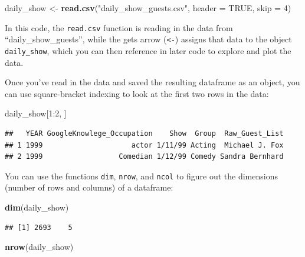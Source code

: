 \documentclass[]{book}
\makeatletter
\newenvironment{Shaded}{\begin{snugshade}}{\end{snugshade}}
\newcommand{\KeywordTok}[1]{\textcolor[rgb]{0.13,0.29,0.53}{\textbf{{#1}}}}
\newcommand{\DataTypeTok}[1]{\textcolor[rgb]{0.13,0.29,0.53}{{#1}}}
\newcommand{\DecValTok}[1]{\textcolor[rgb]{0.00,0.00,0.81}{{#1}}}
\newcommand{\StringTok}[1]{\textcolor[rgb]{0.31,0.60,0.02}{{#1}}}
\newcommand{\OtherTok}[1]{\textcolor[rgb]{0.56,0.35,0.01}{{#1}}}
\newcommand{\NormalTok}[1]{{#1}}
\newenvironment{kframe}{%
\medskip{}
\setlength{\fboxsep}{.8em}
 \def\at@end@of@kframe{}%
 \ifinner\ifhmode%
  \def\at@end@of@kframe{\end{minipage}}%
  \begin{minipage}{\columnwidth}%
 \fi\fi%
 \def\FrameCommand##1{\hskip\@totalleftmargin \hskip-\fboxsep
 \colorbox{shadecolor}{##1}\hskip-\fboxsep
     \hskip-\linewidth \hskip-\@totalleftmargin \hskip\columnwidth}%
 \MakeFramed {\advance\hsize-\width
   \@totalleftmargin\z@ \linewidth\hsize
   \@setminipage}}%
 {\par\unskip\endMakeFramed%
 \at@end@of@kframe}
\renewenvironment{Shaded}{\begin{kframe}}{\end{kframe}}
\makeatother
\begin{document}
\begin{Shaded}
\begin{Highlighting}[]
\NormalTok{daily_show <-}\StringTok{ }\KeywordTok{read.csv}\NormalTok{(}\StringTok{"daily_show_guests.csv"}\NormalTok{,}
                       \DataTypeTok{header =} \OtherTok{TRUE}\NormalTok{,}
                       \DataTypeTok{skip =} \DecValTok{4}\NormalTok{)}
\end{Highlighting}
\end{Shaded}

In this code, the \texttt{read.csv} function is reading in the data from
``daily\_show\_guests'', while the gets arrow (\texttt{\textless{}-})
assigns that data to the object \texttt{daily\_show}, which you can then
reference in later code to explore and plot the data.

Once you've read in the data and saved the resulting dataframe as an
object, you can use square-bracket indexing to look at the first two
rows in the data:

\begin{Shaded}
\begin{Highlighting}[]
\NormalTok{daily_show[}\DecValTok{1}\NormalTok{:}\DecValTok{2}\NormalTok{, ]}
\end{Highlighting}
\end{Shaded}

\begin{verbatim}
##   YEAR GoogleKnowlege_Occupation    Show  Group  Raw_Guest_List
## 1 1999                     actor 1/11/99 Acting  Michael J. Fox
## 2 1999                  Comedian 1/12/99 Comedy Sandra Bernhard
\end{verbatim}

You can use the functions \texttt{dim}, \texttt{nrow}, and \texttt{ncol}
to figure out the dimensions (number of rows and columns) of a
dataframe:

\begin{Shaded}
\begin{Highlighting}[]
\KeywordTok{dim}\NormalTok{(daily_show)}
\end{Highlighting}
\end{Shaded}

\begin{verbatim}
## [1] 2693    5
\end{verbatim}

\begin{Shaded}
\begin{Highlighting}[]
\KeywordTok{nrow}\NormalTok{(daily_show)}
\end{Highlighting}
\end{Shaded}
\end{document}

